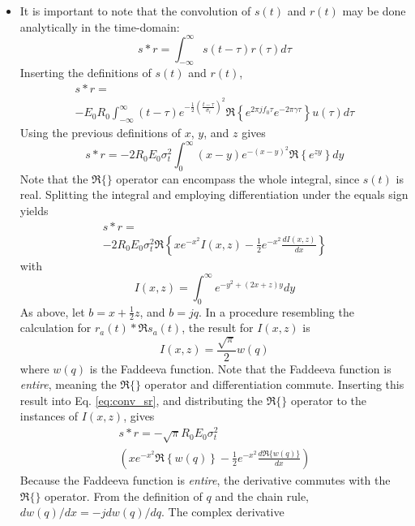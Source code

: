 \documentclass[amsmath,amssymb,aps,prd,10pt,twocolumn,showkeys]{revtex4}
\begin{document}
\begin{itemize}
\begin{figure}[hb]
\caption{\label{fig:fig1} (Top) The thin black line represents $s(t) * r(t)$.  The dark gray envelope represents the envelope of $s(t) * r(t)$ computed with the Python3 package scipy.special.hilbert. The light gray envelope represents Eq. \ref{eq:final}. (Bottom) Same as top, for different parameter values.}
\end{figure}
\clearpage
\item It is important to note that the convolution of $s(t)$ and $r(t)$ may be done analytically in the time-domain:
\begin{equation}
s * r = \int_{-\infty}^{\infty} s(t-\tau) r(\tau) d\tau 
\end{equation}
Inserting the definitions of $s(t)$ and $r(t)$,
\begin{multline}
s * r = \\ -E_0 R_0 \int_{-\infty}^{\infty} (t-\tau) e^{-\frac{1}{2}\left(\frac{t-\tau}{\sigma_t}\right)^2} \Re\left\lbrace e^{2\pi j f_0 \tau} e^{-2\pi\gamma \tau} \right\rbrace u(\tau) d\tau
\end{multline}
Using the previous definitions of $x$, $y$, and $z$ gives
\begin{equation}
s * r = -2R_0 E_0 \sigma_t^2 \int_{0}^{\infty} (x-y) e^{-(x-y)^2} \Re\left\lbrace e^{zy} \right\rbrace dy
\end{equation}
Note that the $\Re\lbrace \rbrace$ operator can encompass the whole integral, since $s(t)$ is real.  Splitting the integral and employing differentiation under the equals sign yields
\begin{multline}
s * r = \\ -2R_0 E_0 \sigma_t^2 \Re\left\lbrace xe^{-x^2}I(x,z) - \frac{1}{2}e^{-x^2} \frac{dI(x,z)}{dx} \right\rbrace \label{eq:conv_sr}
\end{multline}
with
\begin{equation}
I(x,z) = \int_0^{\infty} e^{-y^2 + (2x + z)y}dy
\end{equation}
As above, let $b=x+\frac{1}{2}z$, and $b = j q$.  In a procedure resembling the calculation for $r_a(t) * \Re{s_a(t)}$, the result for $I(x,z)$ is
\begin{equation}
I(x,z) = \frac{\sqrt{\pi}}{2} w(q)
\end{equation}
where $w(q)$ is the Faddeeva function.  Note that the Faddeeva function is \textit{entire}, meaning the $\Re\lbrace \rbrace$ operator and differentiation commute.  Inserting this result into Eq. \ref{eq:conv_sr}, and distributing the $\Re\lbrace \rbrace$ operator to the instances of $I(x,z)$, gives
\begin{multline}
s * r = -\sqrt{\pi}R_0 E_0 \sigma_t^2 \\ \left(xe^{-x^2} \Re\left\lbrace w(q)\right\rbrace - \frac{1}{2}e^{-x^2} \frac{d\Re\lbrace w(q)\rbrace}{dx} \right)
\end{multline}
Because the Faddeeva function is \textit{entire}, the derivative commutes with the $\Re\lbrace\rbrace$ operator.  From the definition of $q$ and the chain rule, $dw(q)/dx = -jdw(q)/dq$.  The complex derivative 
\end{itemize}
\end{document}
